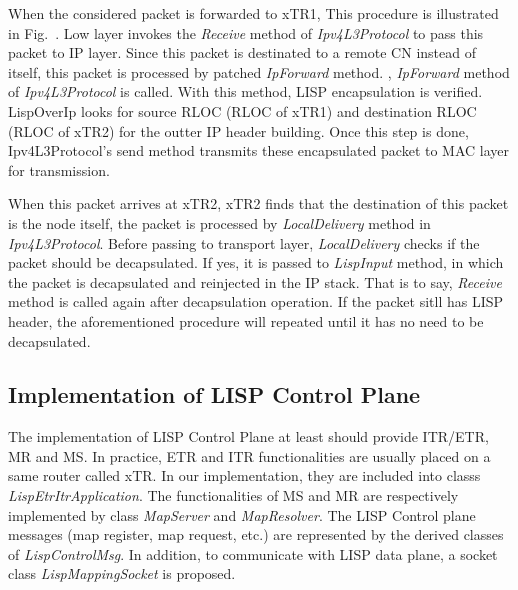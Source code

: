 When the considered packet is forwarded to xTR1, This procedure is illustrated in Fig.~. Low layer invokes the \emph{Receive} method of \emph{Ipv4L3Protocol} to pass this packet to IP layer. Since this packet is destinated to a remote CN instead of itself, this packet is processed by patched \emph{IpForward} method. , \emph{IpForward} method of \emph{Ipv4L3Protocol} is called. With this method, LISP encapsulation is verified. LispOverIp looks for source RLOC (RLOC of xTR1) and destination RLOC (RLOC of xTR2) for the outter IP header building. Once this step is done, Ipv4L3Protocol's send method transmits these encapsulated packet to MAC layer for transmission.

When this packet arrives at xTR2, xTR2 finds that the destination of this packet is the node itself, the packet is processed by \emph{LocalDelivery} method in \emph{Ipv4L3Protocol}. Before passing to transport layer, \emph{LocalDelivery} checks if the packet should be decapsulated. If yes, it is passed to \emph{LispInput} method, in which the packet is decapsulated and reinjected in the IP stack. That is to say, \emph{Receive} method is called again after decapsulation operation. If the packet sitll has LISP header, the aforementioned procedure will repeated until it has no need to be decapsulated.

\subsection{Implementation of LISP Control Plane}
\label{subsec:control-plane-impl}
The implementation of LISP Control Plane at least should provide ITR/ETR, MR and MS. In practice, ETR and ITR functionalities are usually placed on a same router called xTR. In our implementation, they are included into classs \emph{LispEtrItrApplication}.
The functionalities of MS and MR are respectively implemented by class \emph{MapServer} and \emph{MapResolver}. The LISP Control plane messages (map register, map request, etc.) are represented by the derived classes of \emph{LispControlMsg}. In addition, to communicate with LISP data plane, a socket class \emph{LispMappingSocket} is proposed.

